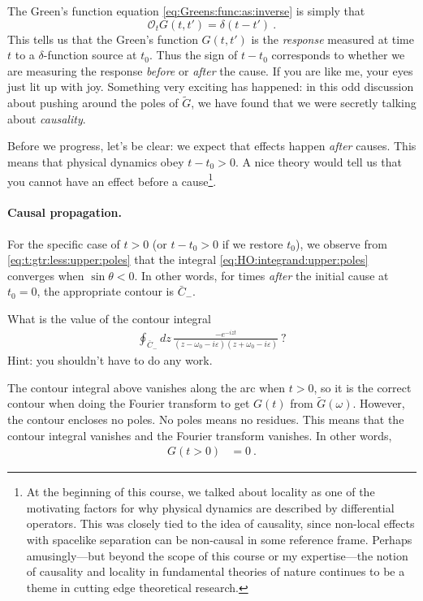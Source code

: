 The Green's function equation \eqref{eq:Greens:func:as:inverse} is simply that $$\mathcal O_t G(t,t') = \delta(t-t')\ .$$ This tells us that the Green's function $G(t,t')$ is the \emph{response} measured at time $t$ to a $\delta$-function source at $t_0$. Thus the sign of $t-t_0$ corresponds to whether we are measuring the response \emph{before} or \emph{after} the cause. If you are like me, your eyes just lit up with joy. Something very exciting has happened: in this odd discussion about pushing around the poles of $\tilde G$, we have found that we were secretly talking about \emph{causality}.  

Before we progress, let's be clear: we expect that effects happen \emph{after} causes. This means that physical dynamics obey $t-t_0 >0$. A nice theory would tell us that you cannot have an effect before a cause\footnote{At the beginning of this course, we talked about locality as one of the motivating factors for why physical dynamics are described by differential operators. This was closely tied to the idea of causality, since non-local effects with spacelike separation can be non-causal in some reference frame. Perhaps amusingly---but beyond the scope of this course or my expertise---the notion of causality and locality in fundamental theories of nature continues to be a theme in cutting edge theoretical research.}. 

\paragraph{Causal propagation.}
For the specific case of $t>0$ (or $t-t_0>0$ if we restore $t_0$), we observe from \eqref{eq:t:gtr:less:upper:poles} that the integral \eqref{eq:HO:integrand:upper:poles} converges when $\sin\theta <0$. In other words, for times \emph{after} the initial cause at $t_0=0$, the appropriate contour is $\bar C_-$. 
\begin{exercise}
What is the value of the contour integral 
\begin{align}
	\oint_{\bar{C}_-} dz\, \frac{-e^{-i z t}}{(z - \omega_0 - i\varepsilon)(z + \omega_0 - i\varepsilon)} \ ?
\end{align}
Hint: you shouldn't have to do any work.
\end{exercise}
The contour integral above vanishes along the arc when $t>0$, so it is the correct contour when doing the Fourier transform to get $G(t)$ from $\tilde G(\omega)$. However, the contour encloses no poles. No poles means no residues. This means that the contour integral vanishes and the Fourier transform vanishes. In other words, 
\begin{align}
	G(t>0) &= 0 \ .
	\label{eq:HO:G:t:gtr:0:zero}
\end{align}

